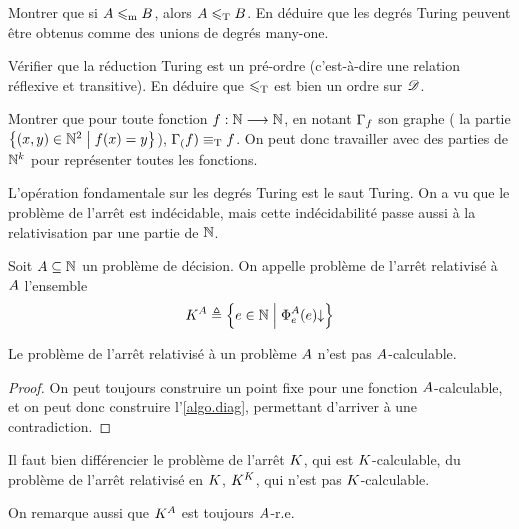 \begin{exercise}
  Montrer que si $A \leqslant_{\mathrm{m}} B$, alors $A \leqslant_{\mathrm{T}} B$.
  En déduire que les degrés Turing peuvent être obtenus comme des unions de
  degrés many-one.
\end{exercise}

\begin{exercise}
  Vérifier que la réduction Turing est un pré-ordre (c'est-à-dire une relation
  réflexive et transitive). En déduire que $\leqslant_{\mathrm{T}}$ est bien un ordre sur
  $\mathscr{D}$.
\end{exercise}

\begin{exercise}
  Montrer que pour toute fonction $f : \displaystyle \mathbb N \longrightarrow \mathbb N$, en notant
  $\Gamma_{f}$ son graphe ( la partie
  $\left\{ (x,y)\in\mathbb N^2 \;\middle\vert\; f(x) = y \right\}$), $\Gamma_{(}f)\equiv_{\mathrm{T}} f$. On peut
  donc travailler avec des parties de $\mathbb N^k$ pour représenter toutes les
  fonctions.
\end{exercise}

L'opération fondamentale sur les degrés Turing est le saut Turing. On a vu que
le problème de l'arrêt est indécidable, mais cette indécidabilité passe aussi à
la relativisation par une partie de $\mathbb N$.

\begin{definition}
  Soit $A\subseteq \mathbb N$ un problème de décision. On appelle problème de
  l'arrêt relativisé à $A$ l'ensemble
  \[K^{A} \triangleq \left\{ e \in \mathbb N \;\middle\vert\; \operatorname{\Phi}_{e}^{A}(e)\mathbin{\downarrow} \right\}\]
  \index[notation]{$\KHP{\varPt}$}
\end{definition}

\begin{proposition}
  Le problème de l'arrêt relativisé à un problème $A$ n'est pas
  $A$-calculable.
\end{proposition}

\begin{proof}
  On peut toujours construire un point fixe pour une fonction
  $A$-calculable, et on peut donc construire l'\cref{algo.diag}, permettant
  d'arriver à une contradiction.
\end{proof}

\begin{remark}
  Il faut bien différencier le problème de l'arrêt $K$, qui est
  $K$-calculable, du problème de l'arrêt relativisé en $K$, $K^{K}$, qui
  n'est pas $K$-calculable.

  On remarque aussi que $\KHP{\varPt}$ est toujours $A$-r.e.
\end{remark}

